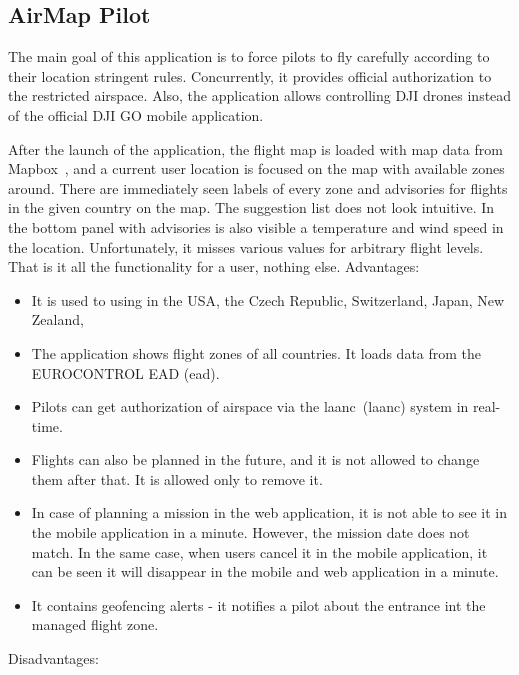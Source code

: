 \subsection{AirMap Pilot}\label{subsec:airmap-pilot}
The main goal of this application is to force pilots to fly carefully according to their location stringent rules.
Concurrently, it provides official authorization to the restricted airspace.
Also, the application allows controlling DJI drones instead of the official DJI GO mobile application.

After the launch of the application, the flight map is loaded with map data from Mapbox~\cite{mapBox}, and a current user location is focused on the map with available zones around.
There are immediately seen labels of every zone and advisories for flights in the given country on the map.
The suggestion list does not look intuitive.
In the bottom panel with advisories is also visible a temperature and wind speed in the location.
Unfortunately, it misses various values for arbitrary flight levels.
That is it all the functionality for a user, nothing else.
\newline
\newline
Advantages:
\begin{itemize}
    \item It is used to using in the USA, the Czech Republic, Switzerland, Japan, New Zealand, \textellipsis
    \item The application shows flight zones of all countries.
    It loads data from the EUROCONTROL EAD (\acrlong{ead}).~\cite{eurocontrol}
    \item Pilots can get authorization of airspace via the \acrshort{laanc}~(\acrlong{laanc}) system in real-time.
    \item Flights can also be planned in the future, and it is not allowed to change them after that.
    It is allowed only to remove it.
    \item In case of planning a mission in the web application, it is not able to see it in the mobile application in a minute.
    However, the mission date does not match.
    In the same case, when users cancel it in the mobile application, it can be seen it will disappear in the mobile and web application in a minute.
    \item It contains geofencing alerts - it notifies a pilot about the entrance int the managed flight zone.
\end{itemize}
Disadvantages:
